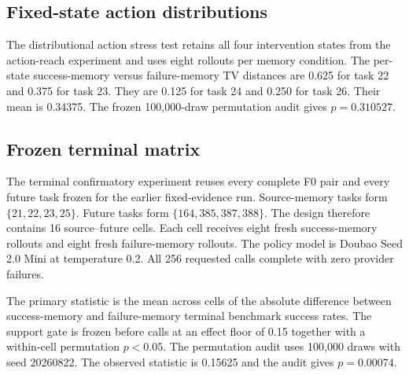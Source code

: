 \subsection{Fixed-state action distributions}
The distributional action stress test retains all four intervention states from the action-reach experiment and uses eight rollouts per memory condition. The per-state success-memory versus failure-memory TV distances are 0.625 for task 22 and 0.375 for task 23. They are 0.125 for task 24 and 0.250 for task 26. Their mean is 0.34375. The frozen 100,000-draw permutation audit gives $p=0.310527$.

\subsection{Frozen terminal matrix}
The terminal confirmatory experiment reuses every complete F0 pair and every future task frozen for the earlier fixed-evidence run. Source-memory tasks form $\{21,22,23,25\}$. Future tasks form $\{164,385,387,388\}$. The design therefore contains 16 source--future cells. Each cell receives eight fresh success-memory rollouts and eight fresh failure-memory rollouts. The policy model is Doubao Seed 2.0 Mini at temperature 0.2. All 256 requested calls complete with zero provider failures.

The primary statistic is the mean across cells of the absolute difference between success-memory and failure-memory terminal benchmark success rates. The support gate is frozen before calls at an effect floor of 0.15 together with a within-cell permutation $p<0.05$. The permutation audit uses 100,000 draws with seed 20260822. The observed statistic is 0.15625 and the audit gives $p=0.00074$.

